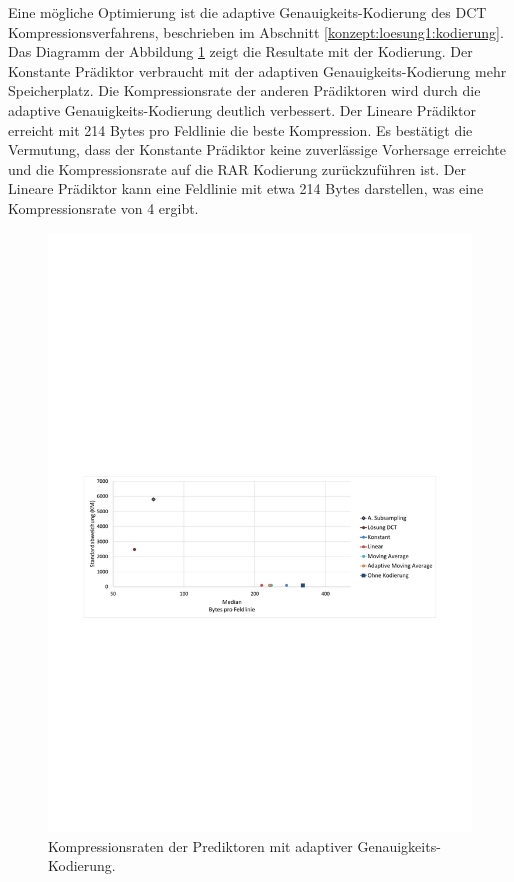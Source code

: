Eine mögliche Optimierung ist die adaptive Genauigkeits-Kodierung des DCT Kompressionsverfahrens, beschrieben im Abschnitt \ref{konzept:loesung1:kodierung}. Das Diagramm der Abbildung \ref{resultate:loesung2:simple:resultate_byte} zeigt die Resultate mit der Kodierung. Der Konstante Prädiktor verbraucht mit der adaptiven Genauigkeits-Kodierung mehr Speicherplatz. Die Kompressionsrate der anderen Prädiktoren wird durch die adaptive Genauigkeits-Kodierung deutlich verbessert. Der Lineare Prädiktor erreicht mit 214 Bytes pro Feldlinie die beste Kompression. Es bestätigt die Vermutung, dass der Konstante Prädiktor keine zuverlässige Vorhersage erreichte und die Kompressionsrate auf die RAR Kodierung zurückzuführen ist. Der Lineare Prädiktor kann eine Feldlinie mit etwa 214 Bytes darstellen, was eine Kompressionsrate von 4 ergibt.

\begin{figure}[!htbp]
	\center
	\includegraphics[trim = 1.8cm 11cm 1.8cm 12.5cm, clip=true,width=1\textwidth,keepaspectratio]{./pictures/resultate/loesung2/variante0/resultate_byte.pdf}
	\caption{Kompressionsraten der Prediktoren mit adaptiver Genauigkeits-Kodierung.}
	\label{resultate:loesung2:simple:resultate_byte}
\end{figure}

